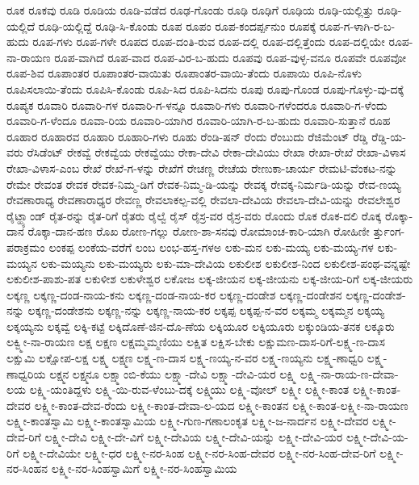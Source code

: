 ರೂಕ
ರೂಕವು
ರೂಡಿ
ರೂಡಿಯ
ರೂಡಿ-ವಡೆದ
ರೂಢ-ಗೊಂಡು
ರೂಢಿ
ರೂಢಿಗೆ
ರೂಢಿಯ
ರೂಢಿ-ಯಲ್ಲಿತ್ತು
ರೂಢಿ-ಯಲ್ಲಿದೆ
ರೂಢಿ-ಯಲ್ಲಿದ್ದೆ
ರೂಢಿ-ಸಿ-ಕೊಂಡು
ರೂಪ
ರೂಪಂ
ರೂಪ-ಕಂದರ್ಪ್ಪನುಂ
ರೂಪಕ್ಕೆ
ರೂಪ-ಗ-ಳಾಗಿ-ರ-ಬ-ಹುದು
ರೂಪ-ಗಳು
ರೂಪ-ಗಳೇ
ರೂಪದ
ರೂಪ-ದಂತಿ-ರುವ
ರೂಪ-ದಲ್ಲಿ
ರೂಪ-ದಲ್ಲಿತ್ತೆಂದು
ರೂಪ-ದಲ್ಲಿಯೇ
ರೂಪ-ನಾ-ರಾಯಣ
ರೂಪ-ವಾಗಿದೆ
ರೂಪ-ವಾದ
ರೂಪ-ವಿರ-ಬ-ಹುದು
ರೂಪವು
ರೂಪ-ವುಳ್ಳ-ವನೂ
ರೂಪವೇ
ರೂಪವೋ
ರೂಪ-ಶಿವ
ರೂಪಾಂತರ
ರೂಪಾಂತರ-ವಾಯಿತು
ರೂಪಾಂತರ-ವಾಯಿ-ತೆಂದು
ರೂಪಾಯಿ
ರೂಪಿ-ನೊಳು
ರೂಪಿಸಲಾಯಿ-ತೆಂದು
ರೂಪಿಸಿ-ಕೊಂಡು
ರೂಪಿ-ಸಿದ
ರೂಪಿ-ಸಿದನು
ರೂಪು
ರೂಪು-ಗೊಂಡ
ರೂಪು-ಗೊಳ್ಳು-ವು-ದಕ್ಕೆ
ರೂಪ್ಯಕ
ರೂವಾರಿ
ರೂವಾರಿ-ಗಳ
ರೂವಾರಿ-ಗ-ಳನ್ನೂ
ರೂವಾರಿ-ಗಳು
ರೂವಾರಿ-ಗಳೆಂದರೂ
ರೂವಾರಿ-ಗ-ಳೆಂದು
ರೂವಾರಿ-ಗ-ಳೆಂದೂ
ರೂವಾ-ರಿಯ
ರೂವಾರಿ-ಯಾಗಿರ
ರೂವಾರಿ-ಯಾಗಿ-ರ-ಬ-ಹುದು
ರೂವಾರಿ-ಸುತ್ತಾನೆ
ರೂಹ
ರೂಹಾರ
ರೂಹಾರವ
ರೂಹಾರಿ
ರೂಹಾರಿ-ಗಳು
ರೂಹು
ರೆಂಡಿ-ಷನ್
ರೆಂದು
ರೆಂಬುದು
ರೆಜಿಮೆಂಟ್
ರೆಡ್ಡಿ
ರೆಡ್ಡಿ-ಯ-ವರು
ರೆಸಿಡೆಂಟ್
ರೇಕವ್ವೆ
ರೇಕವ್ವೆಯ
ರೇಕವ್ವೆಯು
ರೇಕಾ-ದೇವಿ
ರೇಕಾ-ದೇವಿಯು
ರೇಖಾ
ರೇಖಾ-ರೇಖೆ
ರೇಖಾ-ವಿಳಾಸ
ರೇಖಾ-ವಿಳಾಸ-ಎಂಬ
ರೇಖೆ
ರೇಖೆ-ಗ-ಳನ್ನು
ರೇಖೆಗೆ
ರೇಚಣ್ಣ
ರೇಚೆಯ
ರೇಣುಕಾ-ಚಾರ್ಯ
ರೇಮಟಿ-ವೆಂಕಟ-ನನ್ನು
ರೇಮೇ
ರೇವಂತ
ರೇವಕ
ರೇವಕ-ನಿಮ್ಮ-ಡಿಗೆ
ರೇವಕ-ನಿಮ್ಮ-ಡಿ-ಯನ್ನು
ರೇವಕ್ಕ
ರೇವಕ್ಕ-ನಿರ್ಮಡಿ-ಯನ್ನು
ರೇವ-ಣಯ್ಯ
ರೇವಣಾರಾಧ್ಯ
ರೇವಣಾರಾಧ್ಯರ
ರೇವಣ್ಣ
ರೇವಲಾಕಲ್ಪ-ವಲ್ಲಿ
ರೇವಲಾ-ದೇವಿಯ
ರೇವಲಾ-ದೇವಿ-ಯನ್ನು
ರೇವಲೇಶ್ವರ
ರೈಟ್ಹ್ಯಾಂಡ್
ರೈತ-ರನ್ನು
ರೈತ-ರಿಗೆ
ರೈತರು
ರೈಲ್ವೆ
ರೈಸ್
ರೈಸ್ರ-ವರ
ರೈಸ್ರ-ವರು
ರೊಂದು
ರೊಕ
ರೊಕ-ದಲಿ
ರೊಕ್ಕ
ರೊಕ್ಕಾ-ದಾನ
ರೊಕ್ಕಾ-ದಾನ-ಹಣ
ರೊಖ
ರೋಣ-ಗಲ್ಲು
ರೋಣ-ಶಾ-ಸನವು
ರೋಮಾಂಚ-ಕಾರಿ-ಯಾಗಿ
ರೋಹಿಣೀ
ರ್ತ್ತುಂಗ-ಪರಾಕ್ರಮಂ
ಲಂಕಪ್ಪ
ಲಂಕೆಯ-ವರೆಗೆ
ಲಂಬ
ಲಂಭ-ಹಸ್ತ-ಗಳಅ
ಲಕು-ಮನ
ಲಕು-ಮಯ್ಯ
ಲಕು-ಮಯ್ಯ-ಗಳ
ಲಕು-ಮಯ್ಯನ
ಲಕು-ಮಯ್ಯನು
ಲಕು-ಮಯ್ಯರು
ಲಕು-ಮಾ-ದೇವಿಯ
ಲಕುಲೀಶ
ಲಕುಲೀಶ-ನಿಂದ
ಲಕುಲೀಶ-ಪಂಥ-ವನ್ನಷ್ಟೇ
ಲಕುಲೀಶ-ಪಾಶು-ಪತ
ಲಕುಳೀಶ
ಲಕುಳೇಶ್ವರ
ಲಕೋಜ
ಲಕ್ಕ-ಜೀಯನ
ಲಕ್ಕ-ಜೀಯನು
ಲಕ್ಕ-ಜೀಯ-ರಿಗೆ
ಲಕ್ಕ-ಜೀಯರು
ಲಕ್ಕಣ್ಣ
ಲಕ್ಕಣ್ಣ-ದಂಡ-ನಾಯ-ಕನು
ಲಕ್ಕಣ್ಣ-ದಂಡ-ನಾಯ-ಕರ
ಲಕ್ಕಣ್ಣ-ದಂಡೇಶ
ಲಕ್ಕಣ್ಣ-ದಂಡೇಶನ
ಲಕ್ಕಣ್ಣ-ದಂಡೇಶ-ನನ್ನು
ಲಕ್ಕಣ್ಣ-ದಂಡೇಶನು
ಲಕ್ಕಣ್ಣ-ನನ್ನು
ಲಕ್ಕಣ್ಣ-ನಾಯ-ಕರ
ಲಕ್ಕಪ್ಪ
ಲಕ್ಕಪ್ಪ-ನ-ವರ
ಲಕ್ಕಮ್ಮ
ಲಕ್ಕಮ್ಮನ
ಲಕ್ಕಯ್ಯ
ಲಕ್ಕಯ್ಯನು
ಲಕ್ಕವ್ವೆ
ಲಕ್ಕಿ-ಕಟ್ಟೆ
ಲಕ್ಕಿದೊಣೆ-ಜಿನ-ದೊ-ಣೆಯ
ಲಕ್ಕಿಯೂರ
ಲಕ್ಕಿಯೂರು
ಲಕ್ಕುಂಡಿಯ-ತನಕ
ಲಕ್ಕೂರು
ಲಕ್ವ್ಮೀ-ನಾ-ರಾಯಣ
ಲಕ್ಷ
ಲಕ್ಷಣ
ಲಕ್ಷಮ್ಮಮ್ಮಣಿಯು
ಲಕ್ಷಿತ
ಲಕ್ಷಿಸ-ಬೇಕು
ಲಕ್ಷುಮಣ-ದಾಸ-ರಿಗೆ-ಲಕ್ಷ್ಮ-ಣ-ದಾಸ
ಲಕ್ಷುಮಿ
ಲಕ್ಷೋಪ-ಲಕ್ಷ
ಲಕ್ಷ್ಮ
ಲಕ್ಷ್ಮಣ
ಲಕ್ಷ್ಮ-ಣ-ದಾಸ
ಲಕ್ಷ್ಮ-ಣಯ್ಯ-ನ-ವರ
ಲಕ್ಷ್ಮ-ಣಯ್ಯನು
ಲಕ್ಷ್ಮ-ಣಾಧ್ವರಿ
ಲಕ್ಷ್ಮ-ಣಾಧ್ವರಿಯ
ಲಕ್ಷ್ಮನ
ಲಕ್ಷ್ಮನೂ
ಲಕ್ಷ್ಮಾಂಬಿ-ಕೆಯು
ಲಕ್ಷ್ಮಾ-ದೇವಿ
ಲಕ್ಷ್ಮಾ-ದೇವಿ-ಯರ
ಲಕ್ಷ್ಮಿ
ಲಕ್ಷ್ಮಿ-ನಾ-ರಾಯ-ಣ-ದೇವಾ-ಲಯ
ಲಕ್ಷ್ಮಿ-ಯಂತಿದ್ದಳು
ಲಕ್ಷ್ಮಿ-ಯಿ-ರುವ-ಳೆಂಬು-ದಕ್ಕೆ
ಲಕ್ಷ್ಮಿಯು
ಲಕ್ಷ್ಮಿ-ವೋಲ್
ಲಕ್ಷ್ಮೀ
ಲಕ್ಷ್ಮೀ-ಕಾಂತ
ಲಕ್ಷ್ಮೀ-ಕಾಂತ-ದೇವರ
ಲಕ್ಷ್ಮೀ-ಕಾಂತ-ದೇವ-ರೆಂದು
ಲಕ್ಷ್ಮೀ-ಕಾಂತ-ದೇವಾ-ಲ-ಯದ
ಲಕ್ಷ್ಮೀ-ಕಾಂತನ
ಲಕ್ಷ್ಮೀ-ಕಾಂತ-ಲಕ್ಷ್ಮೀ-ನಾ-ರಾಯಣ
ಲಕ್ಷ್ಮೀ-ಕಾಂತಸ್ವಾಮಿ
ಲಕ್ಷ್ಮೀ-ಕಾಂತಸ್ವಾಮಿಯ
ಲಕ್ಷ್ಮೀ-ಗುಣ-ಗಣಾಲಂಕೃತ
ಲಕ್ಷ್ಮೀ-ಜ-ನಾರ್ದನ
ಲಕ್ಷ್ಮೀ-ದೇವರ
ಲಕ್ಷ್ಮೀ-ದೇವ-ರಿಗೆ
ಲಕ್ಷ್ಮೀ-ದೇವಿ
ಲಕ್ಷ್ಮೀ-ದೇ-ವಿಗೆ
ಲಕ್ಷ್ಮೀ-ದೇವಿಯ
ಲಕ್ಷ್ಮೀ-ದೇವಿ-ಯನ್ನು
ಲಕ್ಷ್ಮೀ-ದೇವಿ-ಯರ
ಲಕ್ಷ್ಮೀ-ದೇವಿ-ಯ-ರಿಗೆ
ಲಕ್ಷ್ಮೀ-ದೇವಿಯೇ
ಲಕ್ಷ್ಮೀ-ಧರ
ಲಕ್ಷ್ಮೀ-ನರ-ಸಿಂಹ
ಲಕ್ಷ್ಮೀ-ನರ-ಸಿಂಹ-ದೇವರ
ಲಕ್ಷ್ಮೀ-ನರ-ಸಿಂಹ-ದೇವ-ರಿಗೆ
ಲಕ್ಷ್ಮೀ-ನರ-ಸಿಂಹನ
ಲಕ್ಷ್ಮೀ-ನರ-ಸಿಂಹಸ್ವಾಮಿಗೆ
ಲಕ್ಷ್ಮೀ-ನರ-ಸಿಂಹಸ್ವಾಮಿಯ
